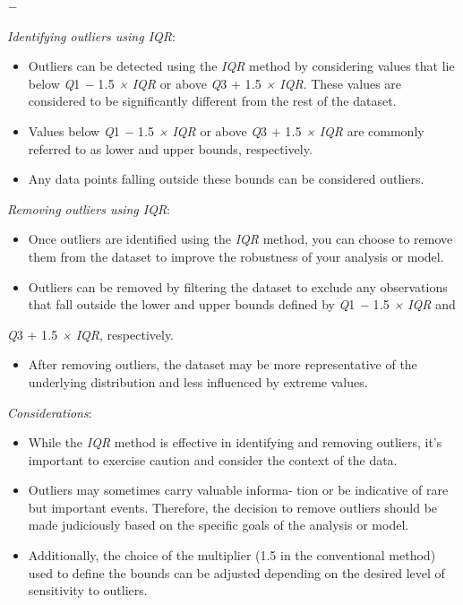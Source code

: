 \begin{multicols}{2}
\emph{−}

\emph{Identifying outliers using IQR}:

\begin{itemize}[leftmargin=*]
\item
  Outliers can be detected using the \emph{IQR} method by considering
  values that lie below \emph{Q}1 \emph{−} 1\emph{.}5 \emph{×}
  \emph{IQR} or above \emph{Q}3 + 1\emph{.}5 \emph{× IQR}. These values
  are considered to be significantly different from the rest of the
  dataset.
\item
  Values below \emph{Q}1 \emph{−} 1\emph{.}5 \emph{× IQR} or above
  \emph{Q}3 + 1\emph{.}5 \emph{×} \emph{IQR} are commonly referred to as
  lower and upper bounds, respectively.
\item
  Any data points falling outside these bounds can be considered
  outliers.
\end{itemize}

\emph{Removing outliers using IQR}:

\begin{itemize}[leftmargin=*]
\item
  Once outliers are identified using the \emph{IQR} method, you can
  choose to remove them from the dataset to improve the robustness of
  your analysis or model.
\item
  Outliers can be removed by filtering the dataset to exclude any
  observations that fall outside the lower and upper bounds defined by
  \emph{Q}1 \emph{−} 1\emph{.}5 \emph{× IQR} and
\end{itemize}

\emph{Q}3 + 1\emph{.}5 \emph{× IQR}, respectively.

\begin{itemize}[leftmargin=*]
\item
  After removing outliers, the dataset may be more representative of the
  underlying distribution and less influenced by extreme values.
\end{itemize}

\emph{Considerations}:

\begin{itemize}[leftmargin=*]
\item
  While the \emph{IQR} method is effective in identifying and removing
  outliers, it's important to exercise caution and consider the context
  of the data.
\item
  Outliers may sometimes carry valuable informa- tion or be indicative
  of rare but important events. Therefore, the decision to remove
  outliers should be made judiciously based on the specific goals of the
  analysis or model.
\item
  Additionally, the choice of the multiplier (1.5 in the conventional
  method) used to define the bounds can be adjusted depending on the
  desired level of sensitivity to outliers.
\end{itemize}


\end{multicols}
